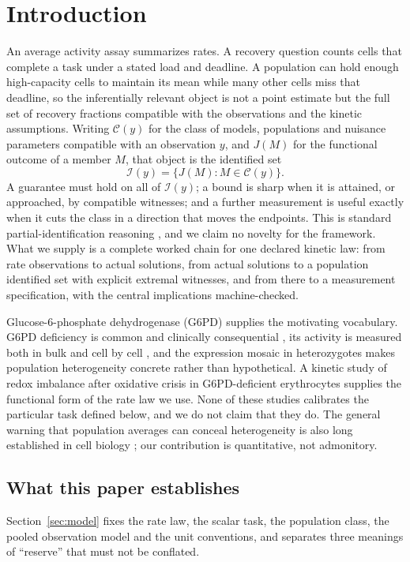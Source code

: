 \documentclass[11pt]{article}
\theoremstyle{definition}
\begin{document}
\section{Introduction}\label{sec:intro}
An average activity assay summarizes rates. A recovery question counts cells
that complete a task under a stated load and deadline. A population can hold
enough high-capacity cells to maintain its mean while many other cells miss
that deadline, so the inferentially relevant object is not a point estimate but
the full set of recovery fractions compatible with the observations and the
kinetic assumptions. Writing $\mathcal C(y)$ for the class of models,
populations and nuisance parameters compatible with an observation $y$, and
$J(M)$ for the functional outcome of a member $M$, that object is the
identified set
\begin{equation}\label{eq:identified}
  \mathcal I(y)=\{J(M):M\in\mathcal C(y)\}.
\end{equation}
A guarantee must hold on all of $\mathcal I(y)$; a bound is sharp when it is
attained, or approached, by compatible witnesses; and a further measurement is
useful exactly when it cuts the class in a direction that moves the endpoints.
This is standard partial-identification reasoning
\cite{manski,tamer,bertsimas}, and we claim no novelty for the framework. What
we supply is a complete worked chain for one declared kinetic law: from rate
observations to actual solutions, from actual solutions to a population
identified set with explicit extremal witnesses, and from there to a
measurement specification, with the central implications machine-checked.

Glucose-6-phosphate dehydrogenase (G6PD) supplies the motivating vocabulary.
G6PD deficiency is common and clinically consequential \cite{luzzatto}, its
activity is measured both in bulk and cell by cell \cite{shah,kalnoky}, and
the expression mosaic in heterozygotes makes population heterogeneity concrete
rather than hypothetical. A kinetic study of redox imbalance after oxidative
crisis in G6PD-deficient erythrocytes \cite{shimo} supplies the functional
form of the rate law we use. None of these studies calibrates the particular
task defined below, and we do not claim that they do. The general warning that
population averages can conceal heterogeneity is also long established in cell
biology \cite{altschuler}; our contribution is quantitative, not
admonitory.

\subsection*{What this paper establishes}
Section~\ref{sec:model} fixes the rate law, the scalar task, the population
class, the pooled observation model and the unit conventions, and separates
three meanings of ``reserve'' that must not be conflated.
\end{document}
